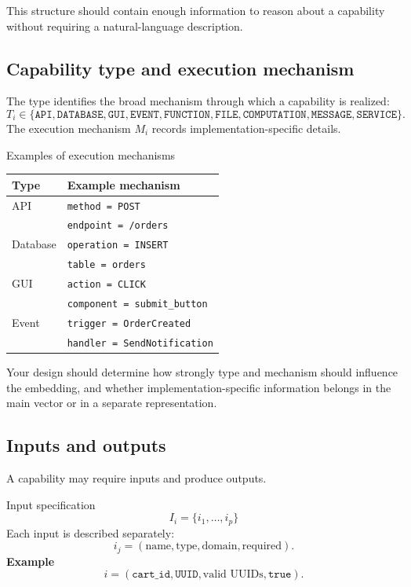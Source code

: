\documentclass[11pt]{article}
\newcommand{\code}[1]{\texttt{#1}}
\newcommand{\true}{\texttt{true}}
\begin{document}
This structure should contain enough information to reason about a capability without
requiring a natural-language description.

\subsection{Capability type and execution mechanism}

The type identifies the broad mechanism through which a capability is realized:
\[
T_i\in\{\code{API},\code{DATABASE},\code{GUI},\code{EVENT},\code{FUNCTION},
\code{FILE},\code{COMPUTATION},\code{MESSAGE},\code{SERVICE}\}.
\]
The execution mechanism \(M_i\) records implementation-specific details.

\begin{examplebox}{Examples of execution mechanisms}
\small
\begin{tabularx}{\textwidth}{@{}L{2.2cm}Y@{}}
\toprule
\textbf{Type} & \textbf{Example mechanism} \\
\midrule
API & \code{method = POST}\\ & \code{endpoint = /orders} \\[0.45em]
Database & \code{operation = INSERT}\\ & \code{table = orders} \\[0.45em]
GUI & \code{action = CLICK}\\ & \code{component = submit\_button} \\[0.45em]
Event & \code{trigger = OrderCreated}\\ & \code{handler = SendNotification} \\
\bottomrule
\end{tabularx}
\end{examplebox}

Your design should determine how strongly type and mechanism should influence the
embedding, and whether implementation-specific information belongs in the main vector or
in a separate representation.

\subsection{Inputs and outputs}

A capability may require inputs and produce outputs.

\begin{examplebox}{Input specification}
\[
 I_i=\{i_1,\ldots,i_p\}
\]
Each input is described separately:
\[
 i_j=(\text{name},\text{type},\text{domain},\text{required}).
\]
\textbf{Example}
\[
i=(\code{cart\_id},\code{UUID},\text{valid UUIDs},\true).
\]
\end{examplebox}
\end{document}
